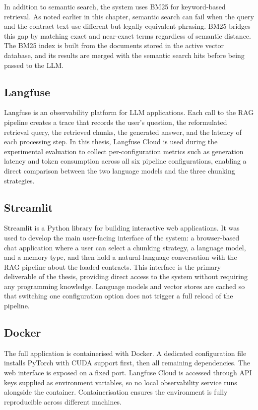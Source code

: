In addition to semantic search, the system uses BM25 \cite{robertson2009bm25} for keyword-based retrieval. As noted earlier in this chapter, semantic search can fail when the query and the contract text use different but legally equivalent phrasing. BM25 bridges this gap by matching exact and near-exact terms regardless of semantic distance. The BM25 index is built from the documents stored in the active vector database, and its results are merged with the semantic search hits before being passed to the LLM.

\subsection{Langfuse}

Langfuse \cite{langfuse2023} is an observability platform for LLM applications.
Each call to the RAG pipeline creates a trace that records the user's question, the
reformulated retrieval query, the retrieved chunks, the generated answer, and the
latency of each processing step. In this thesis, Langfuse Cloud is used during the
experimental evaluation to collect per-configuration metrics such as generation
latency and token consumption across all six pipeline configurations, enabling a
direct comparison between the two language models and the three chunking strategies.


\subsection{Streamlit}

Streamlit \cite{streamlit2019} is a Python library for building interactive web
applications. It was used to develop the main user-facing interface of the system:
a browser-based chat application where a user can select a chunking strategy, a
language model, and a memory type, and then hold a natural-language conversation
with the RAG pipeline about the loaded contracts. This interface is the primary
deliverable of the thesis, providing direct access to the system without requiring
any programming knowledge. Language models and vector stores are cached so that
switching one configuration option does not trigger a full reload of the pipeline.


\subsection{Docker}

The full application is containerised with Docker. A dedicated configuration file
installs PyTorch with CUDA support first, then all remaining dependencies. The web
interface is exposed on a fixed port. Langfuse Cloud is accessed through API keys
supplied as environment variables, so no local observability service runs alongside
the container. Containerisation ensures the environment is fully reproducible across different
machines.

